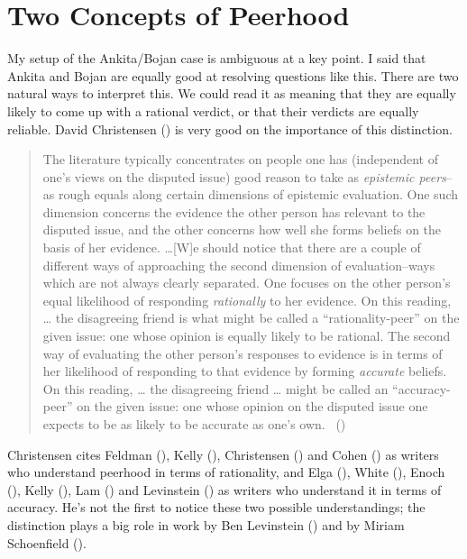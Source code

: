 \documentclass[
  10pt,
  letterpaper,
  twoside]{scrbook}
\begin{document}
\section{Two Concepts of Peerhood}\label{twoconceptsofpeerhood}

My setup of the {Ankita}/{Bojan} case is ambiguous at a key point. I
said that {Ankita} and {Bojan} are equally good at resolving questions
like this. There are two natural ways to interpret this. We could read
it as meaning that they are equally likely to come up with a rational
verdict, or that their verdicts are equally reliable. David Christensen
() is very good on the importance of
this distinction.

\begin{quote}
The literature typically concentrates on people one has (independent of
one's views on the disputed issue) good reason to take as
\emph{epistemic peers}--as rough equals along certain dimensions of
epistemic evaluation. One such dimension concerns the evidence the other
person has relevant to the disputed issue, and the other concerns how
well she forms beliefs on the basis of her evidence. \ldots{[}W{]}e
should notice that there are a couple of different ways of approaching
the second dimension of evaluation--ways which are not always clearly
separated. One focuses on the other person's equal likelihood of
responding \emph{rationally} to her evidence. On this reading, \ldots{}
the disagreeing friend is what might be called a ``rationality-peer'' on
the given issue: one whose opinion is equally likely to be rational. The
second way of evaluating the other person's responses to evidence is in
terms of her likelihood of responding to that evidence by forming
\emph{accurate} beliefs. On this reading, \ldots{} the disagreeing
friend \ldots{} might be called an ``accuracy-peer'' on the given issue:
one whose opinion on the disputed issue one expects to be as likely to
be accurate as one's own. ~()
\end{quote}

Christensen cites Feldman (), Kelly
(), Christensen
() and Cohen
() as writers who understand peerhood in
terms of rationality, and Elga (), White
(), Enoch
(), Kelly
(), Lam () and
Levinstein () as writers who
understand it in terms of accuracy. He's not the first to notice these
two possible understandings; the distinction plays a big role in work by
Ben Levinstein () and by Miriam
Schoenfield ().
\end{document}
